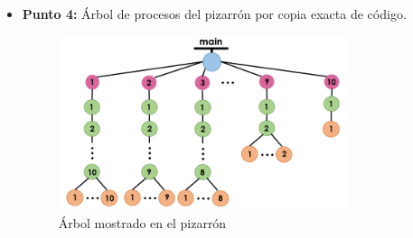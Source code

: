 \documentclass[12pt]{article}
\begin{document}
\begin{itemize}
\begin{itemize}
                
             \end{itemize}
                \newpage
                \item[\Checkmark] \textbf{Punto 4:} Árbol de procesos del pizarrón por copia exacta de código.

        
                \begin{figure}[h!]
                  \centering
                    \includegraphics[width=0.8\textwidth]{Practica4/Images/Linux/arbol4.PNG}                        \caption{Árbol mostrado en el pizarrón}
                \end{figure}
                

\end{itemize}
\end{document}
